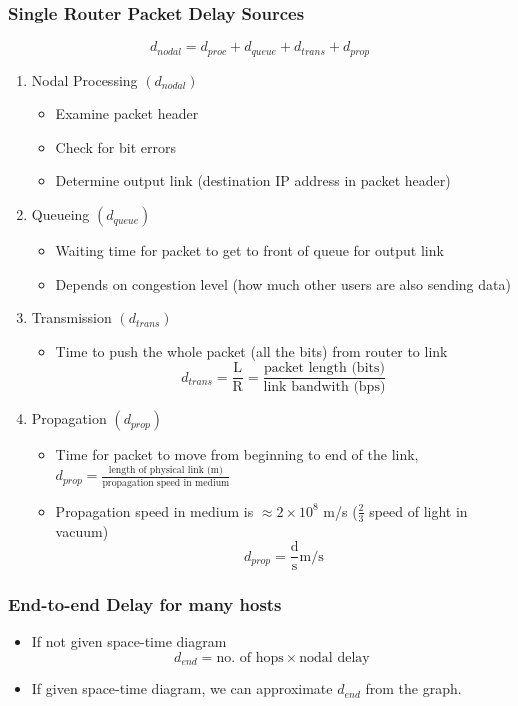 \documentclass[a4paper]{article}
\begin{document}
\subsubsection{Single Router Packet Delay Sources}
$$d_{nodal} = d_{proc} + d_{queue} + d_{trans} + d_{prop}$$
\begin{enumerate}
	\item Nodal Processing $(d_{nodal})$
	\begin{itemize}[label=$\circ$]
		\item Examine packet header
		\item Check for bit errors
		\item Determine output link (destination IP address in packet header)
	\end{itemize}
	\item Queueing $(d_{queue})$
	\begin{itemize}[label=$\circ$]
		\item Waiting time for packet to get to front of queue for output link
		\item Depends on congestion level (how much other users are also sending data)
	\end{itemize}
	\item Transmission $(d_{trans})$
	\begin{itemize}[label=$\circ$]
		\item Time to push the whole packet (all the bits) from router to link $$ d_{trans} = \frac{\text{L}}{\text{R}} = \frac{\text{packet length (bits)}}{\text{link bandwith (bps)}}$$
	\end{itemize}
	\item Propagation $(d_{prop})$
	\begin{itemize}[label=$\circ$]
		\item Time for packet to move from beginning to end of the link,
		$d_{prop} = \frac{\text{length of physical link (m)}}{\text{propagation speed in medium}}$
		\item Propagation speed in medium is $\approx 2\times10^{8}$ m/s ($\frac{2}{3}$ speed of light in vacuum)
		$$ d_{prop} = \frac{\text{d}}{\text{s}} \text{m/s} $$
	\end{itemize}
\end{enumerate}
\subsubsection{End-to-end Delay for many hosts}
\begin{itemize}
	\item If not given space-time diagram $$ d_{end} = \text{no. of hops} \times \text{nodal delay} $$
	\item If given space-time diagram, we can approximate $d_{end}$ from the graph.
\end{itemize}
\end{document}
